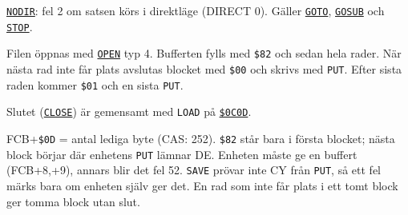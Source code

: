 \begin{Listing}
\Gap
\begin{Cmt}\par\noindent \hyperlink{l:NODIR}{\texttt{NODIR}}: fel 2 om satsen körs i direktläge (DIRECT {}{} 0). Gäller \hyperlink{l:GOTO}{\texttt{GOTO}}, \hyperlink{l:GOSUB}{\texttt{GOSUB}} och \hyperlink{l:STOP}{\texttt{STOP}}.\par\end{Cmt}
\Gap
{}
\begin{Note}\par\noindent Filen öppnas med \hyperlink{l:OPEN}{\texttt{OPEN}} typ 4. Bufferten fylls med \texttt{\$82} och sedan hela rader. När nästa rad inte får plats avslutas blocket med \texttt{\$00} och skrivs med \texttt{PUT}. Efter sista raden kommer \texttt{\$01} och en sista \texttt{PUT}.\par
\par\noindent Slutet (\hyperlink{l:CLOSE}{\texttt{CLOSE}}) är gemensamt med \texttt{LOAD} på \hyperlink{a:0C0D}{\texttt{\$0C0D}}.\par
\par\noindent FCB+\texttt{\$0D} = antal lediga byte (CAS: 252). \texttt{\$82} står bara i första blocket; nästa block börjar där enhetens \texttt{PUT} lämnar DE. Enheten måste ge en buffert (FCB+8,+9), annars blir det fel 52. \texttt{SAVE} prövar inte CY från \texttt{PUT}, så ett fel märks bara om enheten själv ger det. En rad som inte får plats i ett tomt block ger tomma block utan slut.\par\end{Note}

\end{Listing}

